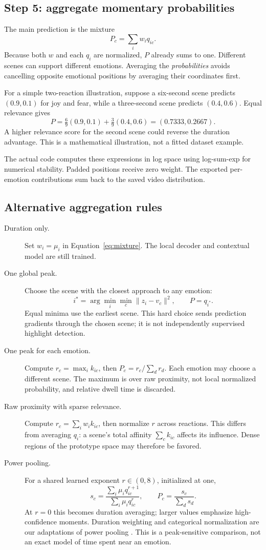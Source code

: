 \documentclass[11pt,a4paper]{article}
\begin{document}
\subsection{Step 5: aggregate momentary probabilities}
The main prediction is the mixture
\begin{equation}
P_c=\sum_i w_iq_{ic}.
\label{eq:mixture}
\end{equation}
Because both $w$ and each $q_i$ are normalized, $P$ already sums to one. Different scenes can support different emotions. Averaging the \emph{probabilities} avoids cancelling opposite emotional positions by averaging their coordinates first.

For a simple two-reaction illustration, suppose a six-second scene predicts $(0.9,0.1)$ for joy and fear, while a three-second scene predicts $(0.4,0.6)$. Equal relevance gives
\[
P=\tfrac69(0.9,0.1)+\tfrac39(0.4,0.6)=(0.7333,0.2667).
\]
A higher relevance score for the second scene could reverse the duration advantage. This is a mathematical illustration, not a fitted dataset example.

The actual code computes these expressions in log space using log-sum-exp for numerical stability. Padded positions receive zero weight. The exported per-emotion contributions sum back to the saved video distribution.

\subsection{Alternative aggregation rules}
\begin{description}
\item[Duration only.] Set $w_i=\mu_i$ in Equation~\ref{eq:mixture}. The local decoder and contextual model are still trained.
\item[One global peak.] Choose the scene with the closest approach to any emotion:
\[
i^*=\arg\min_i\min_c\lVert z_i-v_c\rVert^2,\qquad P=q_{i^*}.
\]
Equal minima use the earliest scene. This hard choice sends prediction gradients through the chosen scene; it is not independently supervised highlight detection.
\item[One peak for each emotion.] Compute $r_c=\max_i k_{ic}$, then $P_c=r_c/\sum_d r_d$. Each emotion may choose a different scene. The maximum is over raw proximity, not local normalized probability, and relative dwell time is discarded.
\item[Raw proximity with sparse relevance.] Compute $r_c=\sum_iw_ik_{ic}$, then normalize $r$ across reactions. This differs from averaging $q_i$: a scene's total affinity $\sum_c k_{ic}$ affects its influence. Dense regions of the prototype space may therefore be favored.
\item[Power pooling.] For a shared learned exponent $r\in(0,8)$, initialized at one,
\[
s_c=\frac{\sum_i\mu_iq_{ic}^{r+1}}{\sum_i\mu_iq_{ic}^{r}},\qquad P_c=\frac{s_c}{\sum_ds_d}.
\]
At $r=0$ this becomes duration averaging; larger values emphasize high-confidence moments. Duration weighting and categorical normalization are our adaptations of power pooling \cite{power}. This is a peak-sensitive comparison, not an exact model of time spent near an emotion.
\end{description}
\end{document}
